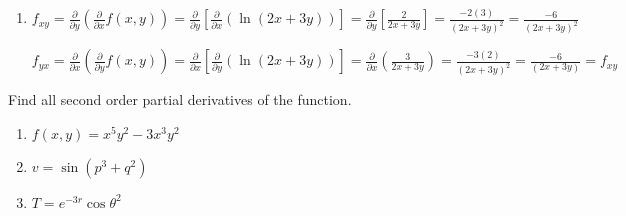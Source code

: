 \begin{Answer}
\begin{enumerate}
    $f_{yx} = \frac{\partial}{\partial x} \left( \frac{\partial}{\partial y} 
    f(x, y) \right) = \frac{\partial}{\partial x} \left[ \frac{\partial}{
    \partial y} \left( \frac{x^2}{x + y} \right) \right] = \frac{\partial}{
    \partial x} \left[ \frac{-x^2}{\left( x + y \right)^2} \right] = \frac{
    \left(x + y \right)^2 \left( -2x \right) - \left( -x^2 \right) \left( 2 
    (x + y ) \right)}{\left( x + y \right)^4} = \frac{\left(x^2 + 2xy + y^2 
    \right) \left(-2x \right) + x^2 \left(2x + 2y \right)}{\left( x + y \right)
    ^4} = \frac{-2x^3 - 4x^2y - 2xy^2 + 2x^3 + 2x^2y}{\left( x + y \right)^4} =
    \frac{-2x^2y - 2xy^2}{\left( x + y \right)^4} = f_{xy}$

    \item $f_{xy} = \frac{\partial}{\partial y} \left( \frac{\partial}{
    \partial x}f(x, y) \right) = \frac{\partial}{\partial y} \left[ \frac{
    \partial}{\partial x} \left( \ln{\left(2x + 3y \right)} \right) \right] = 
    \frac{\partial}{\partial y} \left[ \frac{2}{2x + 3y} \right] = \frac{-2 
    \left( 3 \right)}{ \left( 2x + 3y \right)^2} = \frac{-6}{\left( 2x + 3y 
    \right)^2}$

    $f_{yx} = \frac{\partial}{\partial x} \left( \frac{\partial}{\partial y}
    f(x, y) \right) = \frac{\partial}{\partial x} \left[ \frac{\partial}{
    \partial y} \left( \ln{ \left( 2x + 3y \right)} \right) \right] = \frac{
    \partial}{\partial x} \left( \frac{3}{2x + 3y} \right) = \frac{-3(2)}{
    \left( 2x + 3y \right)^2} = \frac{-6}{\left( 2x + 3y \right)} = f_{xy}$
\end{enumerate}
\end{Answer}

\begin{Exercise}[title = {Second Order Partial Derivatives}, label = second]
Find all second order partial derivatives of the function. 
\begin{enumerate}
\item $f(x, y) = x^5y^2 - 3x^3y^2$
\item $v = \sin{\left( p^3 + q^2 \right)}$
\item $T = e^{-3r} \cos{\theta^2}$
\end{enumerate}
\end{Exercise}

